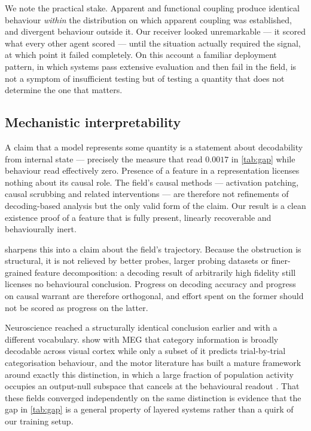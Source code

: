 \documentclass[11pt,a4paper]{article}
\theoremstyle{plain}
\theoremstyle{definition}
\theoremstyle{remark}
\begin{document}
We note the practical stake. Apparent and functional coupling produce identical behaviour \emph{within}
the distribution on which apparent coupling was established, and divergent behaviour outside it. Our
receiver looked unremarkable --- it scored what every other agent scored --- until the situation actually
required the signal, at which point it failed completely. On this account a familiar deployment pattern,
in which systems pass extensive evaluation and then fail in the field, is not a symptom of insufficient
testing but of testing a quantity that does not determine the one that matters.

\subsection{Mechanistic interpretability}
A claim that a model represents some quantity is a statement about decodability from internal state ---
precisely the measure that read $0.0017$ in \cref{tab:gap} while behaviour read effectively zero. Presence
of a feature in a representation licenses nothing about its causal role. The field's causal methods ---
activation patching, causal scrubbing and related interventions \citep{geiger2021causal} --- are therefore
not refinements of decoding-based analysis but the only valid form of the claim. Our result is a clean
existence proof of a feature that is fully present, linearly recoverable and behaviourally inert.

 sharpens this into a claim about the field's trajectory. Because the obstruction is
structural, it is not relieved by better probes, larger probing datasets or finer-grained feature
decomposition: a decoding result of arbitrarily high fidelity still licenses no behavioural conclusion.
Progress on decoding accuracy and progress on causal warrant are therefore orthogonal, and effort spent on
the former should not be scored as progress on the latter.

Neuroscience reached a structurally identical conclusion earlier and with a different vocabulary.
\citet{grootswagers2018finding} show with MEG that category information is broadly decodable across visual
cortex while only a subset of it predicts trial-by-trial categorisation behaviour, and the motor literature
has built a mature framework around exactly this distinction, in which a large fraction of population
activity occupies an output-null subspace that cancels at the behavioural readout
\citep{kaufman2014cortical}. That these fields converged independently on the same distinction is evidence
that the gap in \cref{tab:gap} is a general property of layered systems rather than a quirk of our
training setup.
\end{document}
